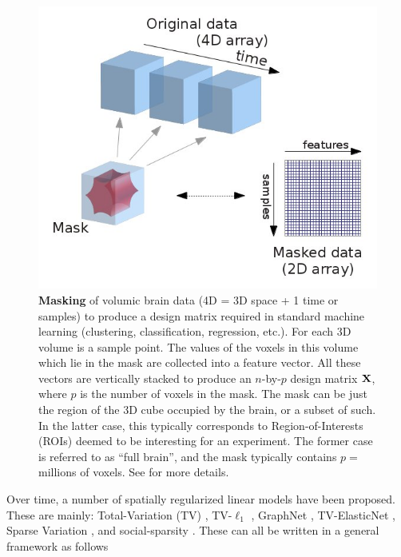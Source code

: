 
  \begin{figure}[!htb] 
  \includegraphics[width=1\linewidth]{figures/masking.jpg}
  \caption{\textbf{Masking} of volumic brain data (4D = 3D space + 1 time or samples)
    to produce a design matrix required in standard machine learning (clustering, classification, regression, etc.). For each 3D volume is a sample point. The values of the voxels in this volume which lie in the mask are collected into a feature vector. All these vectors are vertically stacked to produce an $n$-by-$p$ design matrix $\mathbf{X}$, where $p$ is the number of voxels in the mask. The mask can be just the region of the 3D cube occupied by the brain, or a subset of such. In the latter case, this typically corresponds to Region-of-Interests (ROIs) deemed to be interesting for an experiment. The former case is referred to as ``full brain'', and the mask typically contains $p = $ millions of voxels. See  \citep{abraham2014machine} for more details.}
  \label{fig:masking}
\end{figure}

Over time, a number of spatially regularized linear models have been proposed. These are mainly: Total-Variation (TV)
    \citep{michel2011tv}, TV-$\ell_1$   \citep{baldassarre2012,gramfort2013}, GraphNet   \citep{grosenick2013,hebiri2011},
  TV-ElasticNet   \citep{dubois2014predictive}, Sparse Variation   \citep{eickenberg2015total}, and social-sparsity   \citep{kowalski2013social}. These can all be written in a general framework as follows
  
